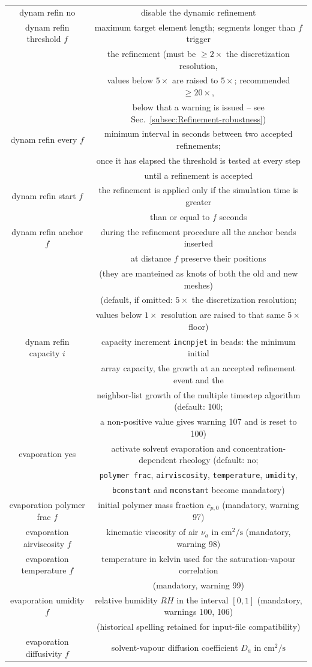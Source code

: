 \begin{longtable}{cc}
dynam refin no  & disable the dynamic refinement\tabularnewline
dynam refin threshold $f$  & maximum target element length; segments longer than $f$ trigger\tabularnewline
 & the refinement (must be $\geq2\times$ the discretization resolution,\tabularnewline
 & values below $5\times$ are raised to $5\times$; recommended $\geq20\times$,\tabularnewline
 & below that a warning is issued -- see Sec.~\ref{subsec:Refinement-robustness})\tabularnewline
dynam refin every $f$  & minimum interval in seconds between two accepted refinements;\tabularnewline
 & \quad{}once it has elapsed the threshold is tested at every step\tabularnewline
 & \quad{}until a refinement is accepted\tabularnewline
dynam refin start $f$  & the refinement is applied only if the simulation time is greater \tabularnewline
 & than or equal to $f$ seconds\tabularnewline
dynam refin anchor $f$ & during the refinement procedure all the anchor beads inserted\tabularnewline
 & at distance $f$ preserve their positions\tabularnewline
 & (they are manteined as knots of both the old and new meshes)\tabularnewline
 & (default, if omitted: $5\times$ the discretization resolution;\tabularnewline
 & values below $1\times$ resolution are raised to that same $5\times$ floor)\tabularnewline
dynam refin capacity $i$ & capacity increment \texttt{incnpjet} in beads: the minimum initial\tabularnewline
 & array capacity, the growth at an accepted refinement event and the\tabularnewline
 & neighbor-list growth of the multiple timestep algorithm (default: 100;\tabularnewline
 & a non-positive value gives warning 107 and is reset to 100)\tabularnewline
evaporation yes  & activate solvent evaporation and concentration-dependent rheology (default: no;\tabularnewline
 & \texttt{polymer frac}, \texttt{airviscosity}, \texttt{temperature}, \texttt{umidity},\tabularnewline
 & \texttt{bconstant} and \texttt{mconstant} become mandatory)\tabularnewline
evaporation polymer frac $f$  & initial polymer mass fraction $c_{p,0}$ (mandatory, warning 97)\tabularnewline
evaporation airviscosity $f$  & kinematic viscosity of air $\nu_a$ in $\mathrm{cm}^{2}/\mathrm{s}$ (mandatory, warning 98)\tabularnewline
evaporation temperature $f$  & temperature in kelvin used for the saturation-vapour correlation\tabularnewline
 & (mandatory, warning 99)\tabularnewline
evaporation umidity $f$  & relative humidity $RH$ in the interval $[0,1]$ (mandatory, warnings 100, 106)\tabularnewline
 & (historical spelling retained for input-file compatibility)\tabularnewline
evaporation diffusivity $f$  & solvent-vapour diffusion coefficient $D_a$ in $\mathrm{cm}^{2}/\mathrm{s}$\tabularnewline

\end{longtable}
